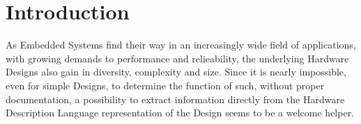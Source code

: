 
\section{Introduction}
As Embedded Systems find their way in an increasingly wide field of applications,
with growing demands to performance and relieability, the underlying Hardware 
Designs also gain in diversity, complexity and size. Since it is nearly impossible,
even for simple Designs, to determine the function of such, without proper
documentation, a possibility to extract information directly from the Hardware 
Description Language representation of the Design seems to be a welcome helper. 
